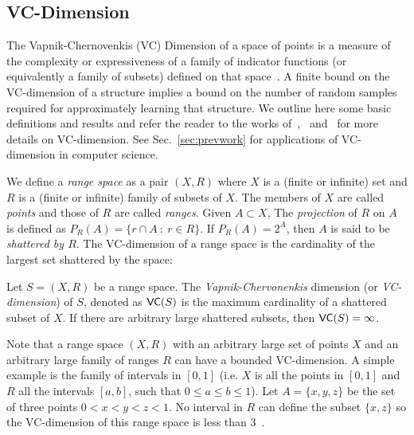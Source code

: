 \subsection{VC-Dimension}\label{sec:prelvcdim}
The Vapnik-Chernovenkis (VC) Dimension of a space of points is a measure of the
complexity or expressiveness of a family of indicator functions (or equivalently
a family of subsets) defined on that space~\citep{VapnikC71}. A finite bound on
the VC-dimension of a structure implies a bound on the number of random samples
required for approximately learning that structure. We outline here some basic
definitions and results and refer the reader to the works
of~\citet[Sec.~14.4]{AlonS08},~\citet{DevroyeGL96} and~\citet{Vapnik99} for more details
on VC-dimension. See Sec.~\ref{sec:prevwork} for applications of VC-dimension in 
computer science.

%
We define a {\em range space} as a pair $(X,R)$ where $X$ is a (finite or infinite) set
 and $R$ is a (finite or infinite) family of subsets of $X$. The members of $X$
 are called {\em points} and those of $R$ are called {\em ranges}.
Given $A\subset X$, The {\em projection} of $R$ on
$A$ is defined as $P_R(A)=\{r\cap A ~:~ r\in R\}$.
%
If $P_R(A)=2^A$, then $A$ is said to be {\em shattered by $R$}.
The VC-dimension of a range space is the cardinality of the largest set
shattered by the space:
\begin{definition}\label{defn:VCdim}
  Let $S=(X,R)$ be a range space. The {\em Vapnik-Chervonenkis} dimension (or
  {\em VC-dimension}) of $S$, denoted as $\mathsf{VC}(S)$ is the maximum cardinality of
  a shattered subset of $X$. If there are arbitrary large shattered subsets,
  then $\mathsf{VC}(S)=\infty$.
\end{definition}

Note that a range space $(X,R)$ with an arbitrary large set of points $X$ and
an arbitrary large family of ranges $R$ can have a bounded VC-dimension. A simple
example is the family of intervals in $[0,1]$ (i.e. $X$ is all the points in
$[0,1]$ and $R$ all the intervals $[a,b]$, such that $0\leq a\leq b\leq 1$). Let
$A=\{x,y,z\}$ be the set of three points $0<x<y<z<1$. No interval in $R$ can
define the subset $\{x,z\}$ so the VC-dimension of this range space is less than
3~\cite[Lemma 10.3.1]{Matousek02}.

